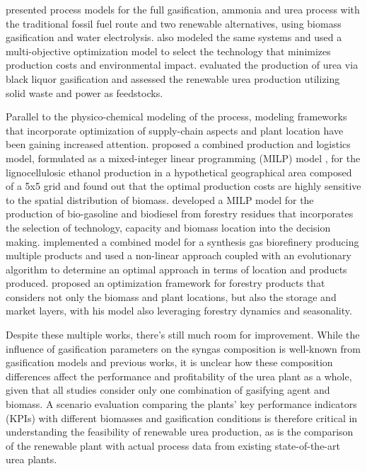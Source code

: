 \documentclass[a4paper, titlepage]{article}
\begin{document}
\textcite{zhangTechnoeconomicComparison1002021} presented process models for the full gasification, ammonia and urea
process with the traditional fossil fuel route and two renewable alternatives, using biomass gasification and water
electrolysis. \textcite{alfianMultiobjectiveOptimizationGreen2019} also modeled the same systems and used a
multi-objective optimization model to select the technology that minimizes production costs and environmental impact.
\textcite{domingosExergyEnvironmentalAnalysis2021} evaluated the production of urea via black liquor gasification
and \textcite{gyanwaliTechnoeconomicAssessmentGreen2023} assessed the renewable urea production utilizing solid waste
and power as feedstocks.

Parallel to the physico-chemical modeling of the process, modeling frameworks that incorporate optimization of
supply-chain aspects and plant location have been gaining increased attention.
\textcite{dunnettSpatiallyExplicitWholesystem2008} proposed a combined production and logistics model, formulated as a
mixed-integer linear programming (MILP) model , for the lignocellulosic ethanol production in a hypothetical geographical
area composed of a 5x5 grid and found out that the optimal production costs are highly sensitive to the spatial
distribution of biomass. \textcite{kimDesignBiomassProcessing2011} developed a MILP model for the production of bio-gasoline and
biodiesel from forestry residues that incorporates the selection of technology, capacity and biomass location into the
decision making. \textcite{schroderImprovingBiorefineryPlanning2018} implemented a combined model for a synthesis
gas biorefinery producing multiple products and used a non-linear approach coupled with an evolutionary algorithm to
determine an optimal approach in terms of location and products produced. \textcite{theozzoMILPFrameworkOptimal2021}
proposed an optimization framework for forestry products that considers not only the biomass and plant locations,
but also the storage and market layers, with his model also leveraging forestry dynamics and seasonality.

Despite these multiple works, there's still much room for improvement. While the influence of gasification parameters
on the syngas composition is well-known from gasification models and previous works, it is unclear how these
composition differences affect the performance and profitability of the urea plant as a whole, given that all studies
consider only one combination of gasifying agent and biomass. A scenario evaluation comparing the plants’ key
performance indicators (KPIs) with different biomasses and gasification conditions is therefore critical in
understanding the feasibility of renewable urea production, as is the comparison of the renewable plant with
actual process data from existing state-of-the-art urea plants.
\end{document}
